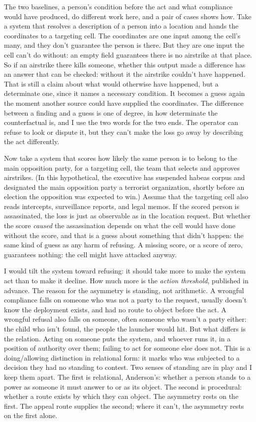 The two baselines, a person's condition before the act and what compliance would have produced, do different work here, and a pair of cases shows how. Take a system that resolves a description of a person into a location and hands the coordinates to a targeting cell. The coordinates are one input among the cell's many, and they don't guarantee the person is there. But they are one input the cell can't do without: an empty field guarantees there is no airstrike at that place. So if an airstrike there kills someone, whether this output made a difference has an answer that can be checked: without it the airstrike couldn't have happened. That is still a claim about what would otherwise have happened, but a determinate one, since it names a necessary condition. It becomes a guess again the moment another source could have supplied the coordinates. The difference between a finding and a guess is one of degree, in how determinate the counterfactual is, and I use the two words for the two ends. The operator can refuse to look or dispute it, but they can't make the loss go away by describing the act differently.

Now take a system that scores how likely the same person is to belong to the main opposition party, for a targeting cell, the team that selects and approves airstrikes. (In this hypothetical, the executive has suspended habeas corpus and designated the main opposition party a terrorist organization, shortly before an election the opposition was expected to win.) Assume that the targeting cell also reads intercepts, surveillance reports, and legal memos. If the scored person is assassinated, the loss is just as observable as in the location request. But whether the score \emph{caused} the assassination depends on what the cell would have done without the score, and that is a guess about something that didn't happen: the same kind of guess as any harm of refusing. A missing score, or a score of zero, guarantees nothing: the cell might have attacked anyway.

I would tilt the system toward refusing: it should take more to make the system act than to make it decline. How much more is the \emph{action threshold}, published in advance. The reason for the asymmetry is standing, not arithmetic. A wrongful compliance falls on someone who was not a party to the request, usually doesn't know the deployment exists, and had no route to object before the act. A wrongful refusal also falls on someone, often someone who wasn't a party either: the child who isn't found, the people the launcher would hit. But what differs is the relation. Acting on someone puts the system, and whoever runs it, in a position of authority over them; failing to act for someone else does not. This is a doing/allowing distinction in relational form: it marks who was subjected to a decision they had no standing to contest. Two senses of standing are in play and I keep them apart. The first is relational, Anderson's: whether a person stands to a power as someone it must answer to or as its object. The second is procedural: whether a route exists by which they can object. The asymmetry rests on the first. The appeal route supplies the second; where it can't, the asymmetry rests on the first alone.

